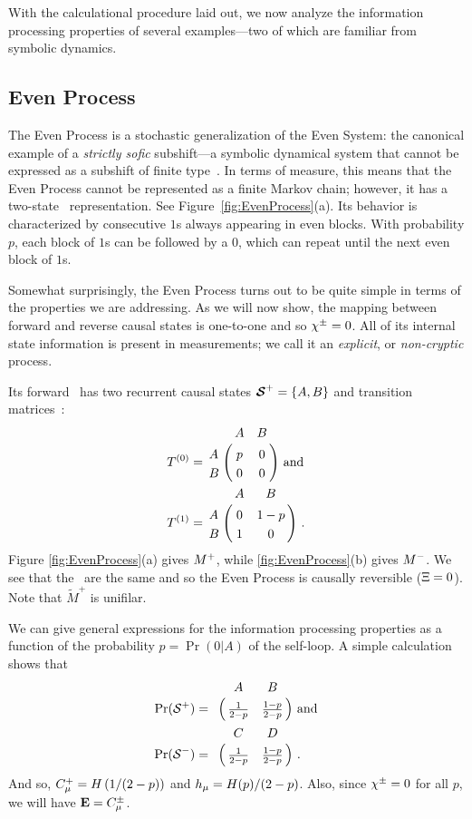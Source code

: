 With the calculational procedure laid out, we now analyze the information
processing properties of several examples---two of which are familiar from 
symbolic dynamics.

\subsection{Even Process}

The Even Process is a stochastic generalization of the Even System: the
canonical example of a \emph{strictly sofic} subshift---a symbolic dynamical system
that cannot be expressed as a subshift of finite type~\cite{Weis73,Crut01a}.
In terms of measure, this means that the Even Process cannot be represented
as a finite Markov chain; however, it has a two-state \eM\ representation.
See Figure~\ref{fig:EvenProcess}(a). Its behavior is characterized by 
consecutive $1$s always appearing in even blocks.  With probability $p$, 
each block of $1$s can be followed by a $0$, which can repeat until the next 
even block of $1$s. 

Somewhat surprisingly, the Even Process turns out to be quite simple in 
terms of the properties we are addressing. As we will now show, the mapping 
between forward and reverse causal states is one-to-one and so $\chi^\pm = 0$. 
All of its internal state information is present in measurements; we call it 
an \emph{explicit}, or \emph{non-cryptic} process.

Its forward \eM\ has two recurrent causal states
${\boldsymbol{\mathcal{S}}}^{+} = \{ A, B \}$ and transition matrices~\cite{Crut01a}:
\begin{align*}
T^{(0)} &=
  \bordermatrix{%
      & A & B \cr
    A & p & 0 \cr
    B & 0   & 0
  }
  \mathrm{~and}\\
T^{(1)} &=
  \bordermatrix{%
      & A & B \cr
    A & 0 & 1-p \cr
    B & 1 & 0
  } ~.
\end{align*}
Figure \ref{fig:EvenProcess}(a) gives ${M}^{+}$, while
\ref{fig:EvenProcess}(b) gives ${M}^{-}$. We see that the \eMs\ are the same
and so the Even Process is causally reversible ($\Xi = 0$). Note
that $\widetilde{M}^+$ is unifilar.

We can give general expressions for the information processing properties 
as a function of the probability $p = \Pr(0|A)$ of the self-loop.
A simple calculation shows that
\begin{align*}
\Pr(\FutureCausalState) &=
  \bordermatrix{
      & A & B \cr
      & \tfrac{1}{2-p} & \tfrac{1-p}{2-p}
  }
  \mathrm{~and}\\
\Pr(\PastCausalState) &=
  \bordermatrix{
      & C & D\cr
      & \tfrac{1}{2-p} & \tfrac{1-p}{2-p}
  } ~.
\end{align*}
And so, $C_\mu^{+} = H \left( 1/(2-p) \right)$ and $h_\mu = H(p)/(2-p)$.
Also, since $\chi^\pm = 0$ for all $p$, we will have ${\bf E} = C_\mu^{\pm}$.

